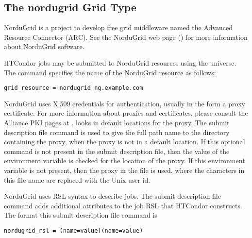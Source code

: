 
\subsection{\label{sec:NorduGrid}The nordugrid Grid Type }

NorduGrid is a project to develop free grid middleware named
the Advanced  Resource Connector (ARC).
See the NorduGrid web page ()
for more information about NorduGrid software.

HTCondor jobs may be submitted to
NorduGrid resources using the  universe.
The  command specifies the name of the
NorduGrid resource as follows:
\begin{verbatim}
grid_resource = nordugrid ng.example.com
\end{verbatim}

NorduGrid uses X.509 credentials for authentication,
usually in the form a proxy certificate. 
For more information about proxies and certificates,
please consult the Alliance PKI pages at
.
 looks in default locations for the proxy. 
The submit description file command 
is used to give the full path name to the directory containing the proxy,
when the proxy is not in a default location.
If this optional command is not present in the submit description file,
then the value of the environment variable
 is checked for the location of the proxy.
If this environment variable is not present, then 
the proxy in the file
 is used,
where the characters \verb@XXXX@ in this file name are
replaced with the Unix user id.

NorduGrid uses RSL syntax to describe jobs.
The submit description file command
adds additional attributes to the job RSL that HTCondor
constructs. 
The format this submit description file command is
\begin{verbatim}
nordugrid_rsl = (name=value)(name=value)
\end{verbatim}
